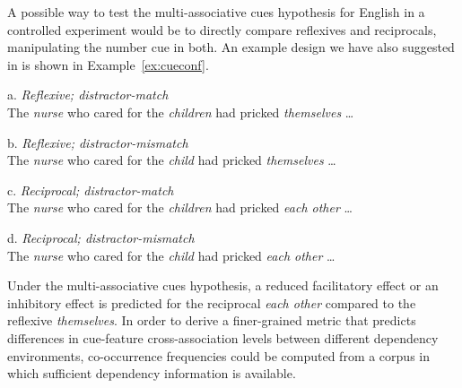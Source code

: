 \documentclass{cambridge7A}\usepackage[]{graphicx}\usepackage[]{color}
\begin{document}
A possible way to test the multi-associative cues hypothesis for English in a controlled experiment would be to directly compare reflexives and reciprocals, manipulating the number cue in both.
An example design we have also suggested in \cite{JaegerEngelmannVasishth2015} is shown in Example~\ref{ex:cueconf}.
%
\begin{exe}
\ex\label{ex:cueconf}
\begin{xlist}
\item  [a.] \textit{Reflexive; distractor-match}\\
The \textit{nurse} who cared for the \textit{children} had pricked \textit{themselves} \dots
\item  [b.] \textit{Reflexive; distractor-mismatch}\\
The \textit{nurse} who cared for the \textit{child} had pricked \textit{themselves} \dots
\item  [c.] \textit{Reciprocal; distractor-match}\\
The \textit{nurse} who cared for the \textit{children} had pricked \textit{each other} \dots
\item  [d.] \textit{Reciprocal; distractor-mismatch}\\
The \textit{nurse} who cared for the \textit{child} had pricked \textit{each other} \dots
\end{xlist}
\end{exe}  
%

Under the multi-associative cues hypothesis, a reduced facilitatory effect or an inhibitory effect is predicted for the reciprocal \textit{each other} compared to the reflexive \textit{themselves}.
%
In order to derive a finer-grained metric that predicts differences in cue-feature cross-association levels between different dependency environments, co-occurrence frequencies could be computed from a corpus in which sufficient dependency information is available.
%
\end{document}
